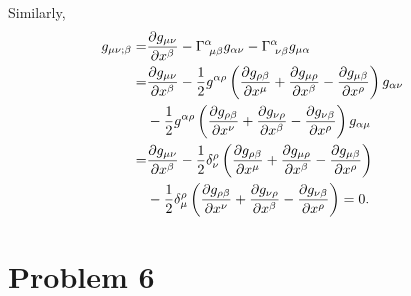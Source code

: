 \documentclass{article}
\begin{document}
Similarly, 
\begin{align}
g_{\mu \nu;\beta} =& \frac{\partial g_{\mu\nu}}{\partial x^\beta}
-\Gamma^\alpha_{~\mu\beta}g_{\alpha \nu}
-\Gamma^\alpha_{~\nu\beta}g_{\mu\alpha}\cr
=&\frac{\partial g_{\mu\nu}}{\partial x^\beta}
-\frac{1}{2}g^{\alpha \rho}
\left(
\frac{\partial g_{\rho \beta}}{\partial x^\mu}
+\frac{\partial g_{\mu \rho}}{\partial x^\beta}
-\frac{\partial g_{\mu\beta}}{\partial x^\rho}
\right)
g_{\alpha \nu}\cr
&-\frac{1}{2}g^{\alpha \rho}
\left(
\frac{\partial g_{\rho \beta}}{\partial x^\nu}
+\frac{\partial g_{\nu \rho}}{\partial x^\beta}
-\frac{\partial g_{\nu\beta}}{\partial x^\rho}
\right)
g_{\alpha \mu}\cr
=&\frac{\partial g_{\mu\nu}}{\partial x^\beta}
-\frac{1}{2}\delta^{\rho}_{ \nu}
\left(
\frac{\partial g_{\rho \beta}}{\partial x^\mu}
+\frac{\partial g_{\mu \rho}}{\partial x^\beta}
-\frac{\partial g_{\mu\beta}}{\partial x^\rho}
\right)\cr
&-\frac{1}{2}\delta^{\rho}_{\mu}
\left(
\frac{\partial g_{\rho \beta}}{\partial x^\nu}
+\frac{\partial g_{\nu \rho}}{\partial x^\beta}
-\frac{\partial g_{\nu\beta}}{\partial x^\rho}
\right)
=0.
\end{align}



\section*{Problem 6}
\end{document}

